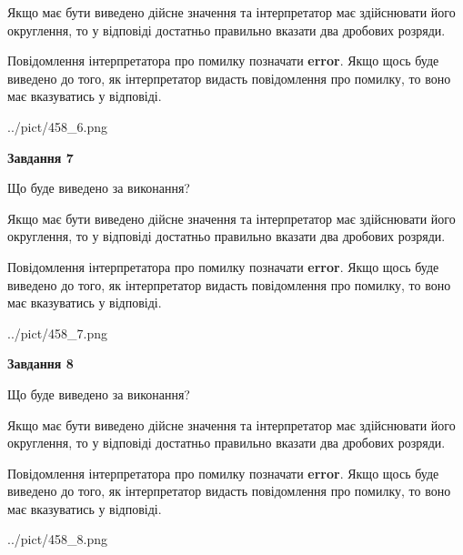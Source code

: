 \documentclass[12pt, ukrainian]{article}
\begin{document}
{\begin {Large}
Якщо має бути виведено дійсне значення та інтерпретатор має здійснювати його округлення, 
то у відповіді достатньо правильно вказати два дробових розряди.

Повідомлення інтерпретатора про помилку позначати \textbf{error}.
Якщо щось буде виведено до того, як інтерпретатор видасть повідомлення про помилку, 
то воно має вказуватись у відповіді. \par

\begin{center}
	{../pict/458_6.png}
\end{center}
\newpage

{\begin {center}\textbf{Завдання 7}\end {center}}\par
Що буде виведено за виконання? \par

Якщо має бути виведено дійсне значення та інтерпретатор має здійснювати його округлення, 
то у відповіді достатньо правильно вказати два дробових розряди.

Повідомлення інтерпретатора про помилку позначати \textbf{error}.
Якщо щось буде виведено до того, як інтерпретатор видасть повідомлення про помилку, 
то воно має вказуватись у відповіді. \par

\begin{center}
	{../pict/458_7.png}
\end{center}
\newpage

{\begin {center}\textbf{Завдання 8}\end {center}}\par
Що буде виведено за виконання? \par

Якщо має бути виведено дійсне значення та інтерпретатор має здійснювати його округлення, 
то у відповіді достатньо правильно вказати два дробових розряди.

Повідомлення інтерпретатора про помилку позначати \textbf{error}.
Якщо щось буде виведено до того, як інтерпретатор видасть повідомлення про помилку, 
то воно має вказуватись у відповіді. \par

\begin{center}
	{../pict/458_8.png}
\end{center}
\newpage


\end{Large}}
\end{document}
